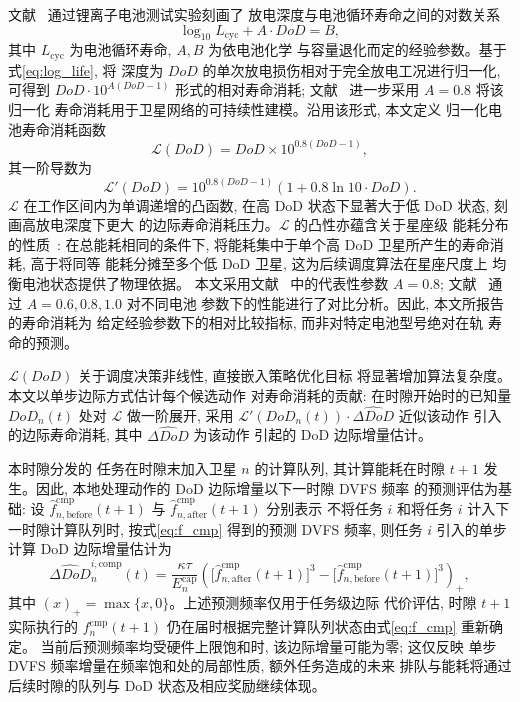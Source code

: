 \documentclass[a4paper,11pt]{article}
\begin{document}
文献~\cite{yang2016energy} 通过锂离子电池测试实验刻画了
放电深度与电池循环寿命之间的对数关系
\begin{equation}
    \log_{10} L_{\mathrm{cyc}} + A \cdot DoD = B,
    \label{eq:log_life}
\end{equation}
其中 $L_{\mathrm{cyc}}$ 为电池循环寿命, $A, B$ 为依电池化学
与容量退化而定的经验参数。基于式\eqref{eq:log_life}, 将
深度为 $DoD$ 的单次放电损伤相对于完全放电工况进行归一化,
可得到 $DoD \cdot 10^{A(DoD-1)}$ 形式的相对寿命消耗;
文献~\cite{chen2025tasri} 进一步采用 $A = 0.8$ 将该归一化
寿命消耗用于卫星网络的可持续性建模。沿用该形式, 本文定义
归一化电池寿命消耗函数
\begin{equation}
    \mathcal{L}(DoD) = DoD \times 10^{0.8(DoD - 1)},
    \label{eq:health_loss}
\end{equation}
其一阶导数为
\begin{equation}
    \mathcal{L}'(DoD) = 10^{0.8(DoD - 1)}
    \left(1 + 0.8 \ln 10 \cdot DoD\right).
    \label{eq:health_loss_deriv}
\end{equation}
$\mathcal{L}$ 在工作区间内为单调递增的凸函数,
在高 DoD 状态下显著大于低 DoD 状态, 刻画高放电深度下更大
的边际寿命消耗压力。$\mathcal{L}$ 的凸性亦蕴含关于星座级
能耗分布的性质~\cite{chen2025tasri}: 在总能耗相同的条件下,
将能耗集中于单个高 DoD 卫星所产生的寿命消耗, 高于将同等
能耗分摊至多个低 DoD 卫星, 这为后续调度算法在星座尺度上
均衡电池状态提供了物理依据。
本文采用文献~\cite{chen2025tasri} 中的代表性参数 $A = 0.8$;
文献~\cite{li2024battery} 通过 $A = 0.6, 0.8, 1.0$ 对不同电池
参数下的性能进行了对比分析。因此, 本文所报告的寿命消耗为
给定经验参数下的相对比较指标, 而非对特定电池型号绝对在轨
寿命的预测。


$\mathcal{L}(DoD)$ 关于调度决策非线性, 直接嵌入策略优化目标
将显著增加算法复杂度。本文以单步边际方式估计每个候选动作
对寿命消耗的贡献: 在时隙开始时的已知量 $DoD_n(t)$ 处对
$\mathcal{L}$ 做一阶展开, 采用
$\mathcal{L}'(DoD_n(t)) \cdot \widehat{\Delta DoD}$ 近似该动作
引入的边际寿命消耗, 其中 $\widehat{\Delta DoD}$ 为该动作
引起的 DoD 边际增量估计。


本时隙分发的
任务在时隙末加入卫星 $n$ 的计算队列, 其计算能耗在时隙 $t+1$
发生。因此, 本地处理动作的 DoD 边际增量以下一时隙 DVFS 频率
的预测评估为基础: 设 $\widehat{f}^{\mathrm{cmp}}_{n,\mathrm{before}}(t+1)$
与 $\widehat{f}^{\mathrm{cmp}}_{n,\mathrm{after}}(t+1)$ 分别表示
不将任务 $i$ 和将任务 $i$ 计入下一时隙计算队列时,
按式\eqref{eq:f_cmp} 得到的预测 DVFS 频率, 则任务 $i$
引入的单步计算 DoD 边际增量估计为
\begin{equation}
    \widehat{\Delta DoD}^{i,\mathrm{comp}}_n(t)
    = \frac{\kappa \tau}{E^{\mathrm{cap}}_n}\left(
    \big[\widehat{f}^{\mathrm{cmp}}_{n,\mathrm{after}}(t+1)\big]^3
    - \big[\widehat{f}^{\mathrm{cmp}}_{n,\mathrm{before}}(t+1)\big]^3
    \right)_+,
    \label{eq:delta_dod_comp_task}
\end{equation}
其中 $(x)_+ = \max\{x, 0\}$。上述预测频率仅用于任务级边际
代价评估, 时隙 $t+1$ 实际执行的 $f^{\mathrm{cmp}}_n(t+1)$
仍在届时根据完整计算队列状态由式\eqref{eq:f_cmp} 重新确定。
当前后预测频率均受硬件上限饱和时, 该边际增量可能为零; 这仅反映
单步 DVFS 频率增量在频率饱和处的局部性质, 额外任务造成的未来
排队与能耗将通过后续时隙的队列与 DoD 状态及相应奖励继续体现。
\end{document}
